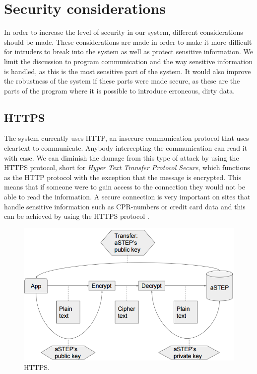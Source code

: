 \section{Security considerations}\label{sec:secure}
In order to increase the level of security in our system, different considerations should be made. These considerations are made in order to make it more difficult for intruders to break into the system as well as protect sensitive information. We limit the discussion to program communication and the way sensitive information is handled, as this is the most sensitive part of the system. It would also improve the robustness of the system if these parts were made secure, as these are the parts of the program where it is possible to introduce erroneous, dirty data.

\subsection*{HTTPS} 
The system currently uses HTTP, an insecure communication protocol that uses cleartext to communicate. Anybody intercepting the communication can read it with ease. We can diminish the damage from this type of attack by using the HTTPS protocol, short for \textit{Hyper Text Transfer Protocol Secure}, which functions as the HTTP protocol with the exception that the message is encrypted. This means that if someone were to gain access to the connection they would not be able to read the information. A secure connection is very important on sites that handle sensitive information such as CPR-numbers or credit card data and this can be achieved by using the HTTPS protocol \cite{HTTPS}.

\begin{figure}[ht]
	\begin{center}
		\includegraphics[scale=0.9]{graphics/encrypt_decrypt.png}
		\caption{HTTPS.}
		\label{fig:HTTPS}
	\end{center} 
\end{figure}

